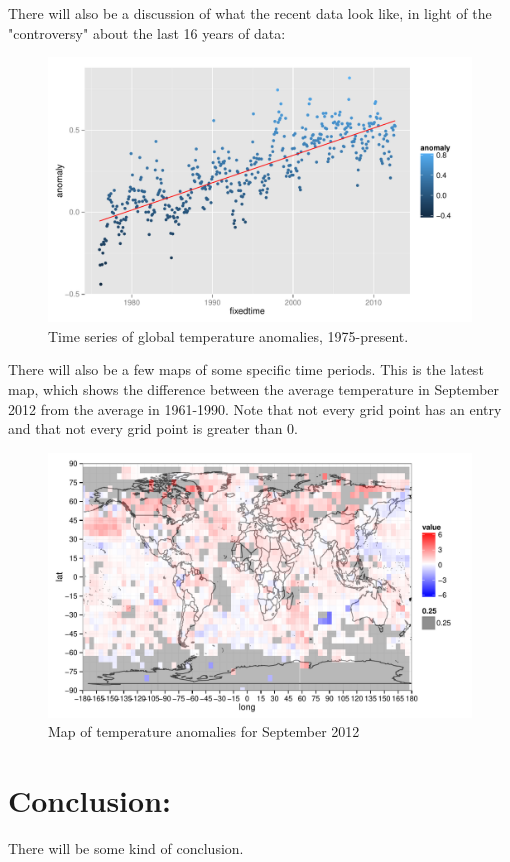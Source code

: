 \documentclass{article}\usepackage{graphicx, color}
\newenvironment{knitrout}{}{} %
\begin{document}
There will also be a discussion of what the recent data look like, in light of the "controversy" about the last 16 years of data: 

\begin{figure}[!htb]
\begin{knitrout}
\color{fgcolor}\includegraphics[width=\linewidth]{figure/recent-trend} 
\end{knitrout}

\caption{\label{recenttrend}Time series of global temperature anomalies, 1975-present.}
\end{figure}

There will also be a few maps of some specific time periods. This is the latest map, which shows the difference between the average temperature in September 2012 from the average in 1961-1990. Note that not every grid point has an entry and that not every grid point is greater than 0. 

\begin{figure}[htb!]
\begin{knitrout}
\color{fgcolor}\includegraphics[width=\linewidth]{figure/recent-map} 
\end{knitrout}

\caption{\label{sep2012map}Map of temperature anomalies for September 2012}
\end{figure}

\section{Conclusion:}
There will be some kind of conclusion.
\end{document}

